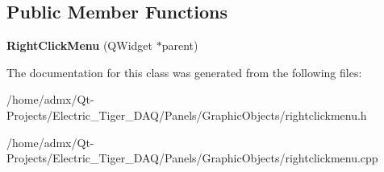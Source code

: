 \subsection*{Public Member Functions}
\begin{DoxyCompactItemize}
\item 
\hypertarget{class_right_click_menu_afa4f52467f82c6d5de54999ba037428f}{{\bfseries Right\+Click\+Menu} (Q\+Widget $\ast$parent)}\label{class_right_click_menu_afa4f52467f82c6d5de54999ba037428f}

\end{DoxyCompactItemize}


The documentation for this class was generated from the following files\+:\begin{DoxyCompactItemize}
\item 
/home/admx/\+Qt-\/\+Projects/\+Electric\+\_\+\+Tiger\+\_\+\+D\+A\+Q/\+Panels/\+Graphic\+Objects/rightclickmenu.\+h\item 
/home/admx/\+Qt-\/\+Projects/\+Electric\+\_\+\+Tiger\+\_\+\+D\+A\+Q/\+Panels/\+Graphic\+Objects/rightclickmenu.\+cpp\end{DoxyCompactItemize}
